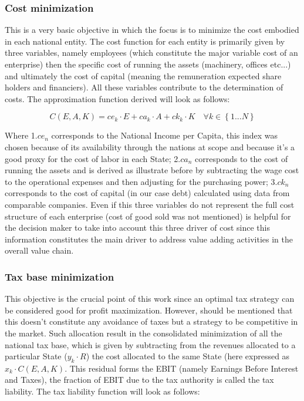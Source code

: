 \begin{doublespace}
\subsubsection{Cost minimization}
This is a very basic objective in which the focus is to  minimize the cost embodied in each national entity. The cost function for each entity is primarily given by three variables, namely employees (which constitute the major variable cost of an enterprise) then the specific cost of running the assets (machinery, offices etc...) and ultimately the cost of capital (meaning the remuneration expected share holders and financiers). All these variables contribute to the determination of costs. The approximation function derived will look as follows:

\begin{equation}
C(E,A,K)=ce_k\cdot E+ca_k\cdot A+ck_k\cdot K \quad \forall k \in \left\{1...N\right\}
\end{equation}

Where 1.$ce_n$ corresponds to the National Income per Capita, this index was chosen because of its availability through the nations at scope and because it's a good proxy for the cost of labor in each State; 2.$ca_n$ corresponds to the cost of running the assets and is derived as illustrate before by subtracting the wage cost to the operational expenses and then adjusting for the purchasing power; 3.$ck_n$ corresponds to the cost of capital (in our case debt) calculated using data from comparable companies.
Even if this three variables do not represent the full cost structure of each enterprise (cost of good sold was not mentioned) is helpful for the decision maker to take into account this three driver of cost since this information constitutes the main driver to address value adding activities in the overall value chain.

\subsubsection{Tax base minimization}
This objective is the crucial point of this work since an optimal tax strategy can be considered good for profit maximization. However, should be mentioned that this doesn't constitute any avoidance of taxes but a strategy to be competitive in the market. Such allocation result in the consolidated minimization of all the national tax base, which is given by subtracting from the revenues allocated to a particular State ($y_k \cdot R$) the cost allocated to the same State (here expressed as $x_k \cdot C(E, A,K)$. This residual forms the EBIT (namely Earnings Before Interest and Taxes), the fraction of EBIT due to the tax authority is called the tax liability. The tax liability function will look as follows:


\end{doublespace}

